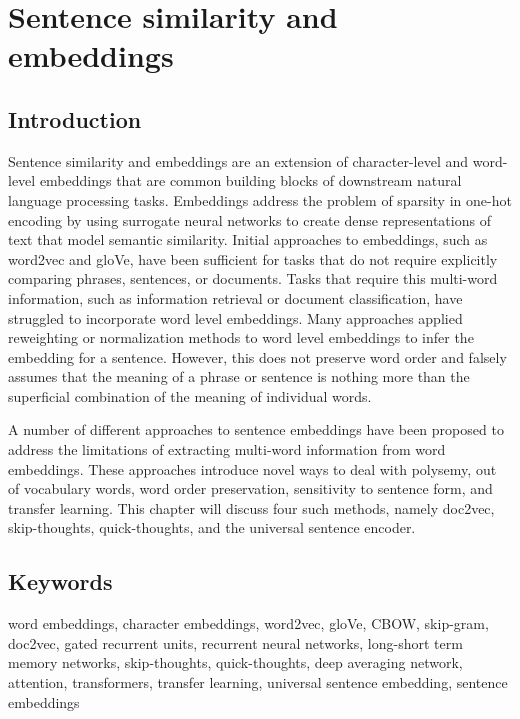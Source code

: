 \chapter{Sentence similarity and embeddings}
\section{\label{sec:level1} Introduction}

Sentence similarity and embeddings are an extension of character-level and word-level embeddings that are common building blocks of downstream natural language processing tasks. Embeddings address the problem of sparsity in one-hot encoding by using surrogate neural networks to create dense representations of text that model semantic similarity. Initial approaches to embeddings, such as word2vec and gloVe, have been sufficient for tasks that do not require explicitly comparing phrases, sentences, or documents. Tasks that require this multi-word information, such as information retrieval or document classification, have struggled to incorporate word level embeddings. Many approaches applied reweighting or normalization methods to word level embeddings to infer the embedding for a sentence. However, this does not preserve word order and falsely assumes that the meaning of a phrase or sentence is nothing more than the superficial combination of the meaning of individual words. 

A number of different approaches to sentence embeddings have been proposed to address the limitations of extracting multi-word information from word embeddings. These approaches introduce novel ways to deal with polysemy, out of vocabulary words, word order preservation, sensitivity to sentence form, and transfer learning. This chapter will discuss four such methods, namely doc2vec, skip-thoughts, quick-thoughts, and the universal sentence encoder. 


\section{\label{keywords} Keywords}
word embeddings, character embeddings, word2vec, gloVe, CBOW, skip-gram, doc2vec, gated recurrent units, recurrent neural networks, long-short term memory networks, skip-thoughts, quick-thoughts, deep averaging network, attention, transformers, transfer learning, universal sentence embedding, sentence embeddings

